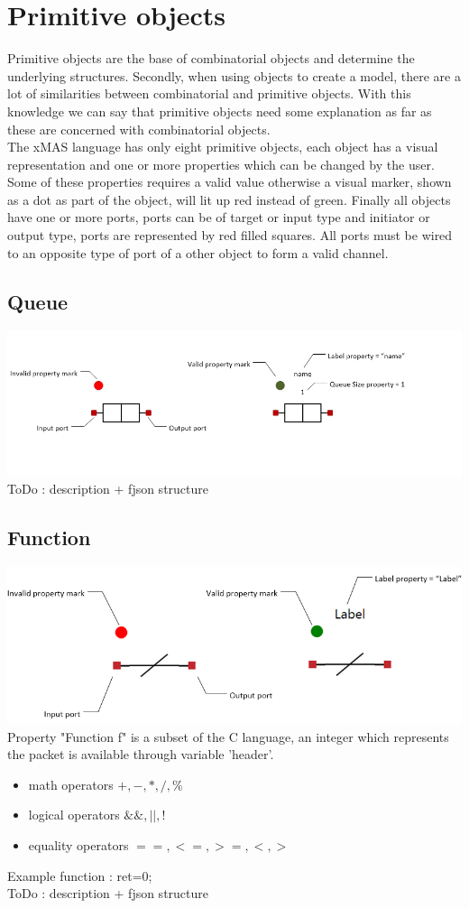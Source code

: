 \documentclass[a4paper,11pt,final]{article}
\begin{document}
\newpage
\section{Primitive objects}
Primitive objects are the base of combinatorial objects and determine the underlying structures. Secondly, when using objects to create a model, there are a lot of similarities between combinatorial and primitive objects. With this knowledge we can say that primitive objects need some explanation as far as these are concerned with combinatorial objects.
\\The xMAS language has only eight primitive objects, each object has a visual representation and one or more properties which can be changed by the user. Some of these properties requires a valid value otherwise a visual marker, shown as a dot as part of the object, will lit up red instead of green. Finally all objects have one or more ports, ports can be of target or input type and initiator or output type, ports are represented by red filled squares. All ports must be wired to an opposite type of port of a other object to form a valid channel.


\subsection{Queue}
\includegraphics[width=1.0\textwidth]{queue}
\\ToDo : description + fjson structure
\subsection{Function}
\includegraphics[width=1.0\textwidth]{function}
\\Property "Function f" is a subset of the C language, an integer which represents the packet is available through variable 'header'. 
\begin{itemize}
\item math operators $+,-,*,/,\%$
\item logical operators $\&\&,||,!$
\item equality operators $==,<=,>=,<,>$
\end{itemize} 
Example function : ret=0;
\\ToDo : description + fjson structure
\end{document}
